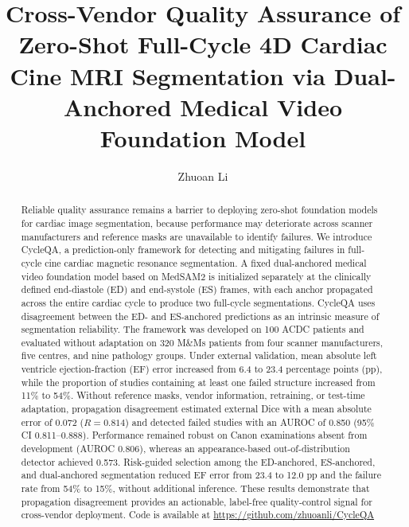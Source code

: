\documentclass[runningheads]{llncs}
\newcommand{\CQ}{CycleQA}
\begin{document}
\title{Cross-Vendor Quality Assurance of Zero-Shot Full-Cycle 4D Cardiac Cine MRI
Segmentation via Dual-Anchored Medical Video Foundation Model}

\author{Zhuoan Li}

\maketitle
\begin{abstract}
Reliable quality assurance remains a barrier to deploying zero-shot foundation models for cardiac image segmentation, because performance may deteriorate across scanner manufacturers and reference masks are unavailable to identify failures. We introduce \CQ{}, a prediction-only framework for detecting and mitigating failures in full-cycle cine cardiac magnetic resonance segmentation. A fixed dual-anchored medical video foundation model based on MedSAM2 is initialized separately at the clinically defined end-diastole (ED) and end-systole (ES) frames, with each anchor propagated across the entire cardiac cycle to produce two full-cycle segmentations. \CQ{} uses disagreement between the ED- and ES-anchored predictions as an intrinsic measure of segmentation reliability. The framework was developed on 100 ACDC patients and evaluated without adaptation on 320 M\&Ms patients from four scanner manufacturers, five centres, and nine pathology groups. Under external validation, mean absolute left ventricle ejection-fraction (EF) error increased from 6.4 to 23.4 percentage points (pp), while the proportion of studies containing at least one failed structure increased from 11\% to 54\%. Without reference masks, vendor information, retraining, or test-time adaptation, propagation disagreement estimated external Dice with a mean absolute error of 0.072 ($R=0.814$) and detected failed studies with an AUROC of 0.850 (95\% CI 0.811--0.888). Performance remained robust on Canon examinations absent from development (AUROC 0.806), whereas an appearance-based out-of-distribution detector achieved 0.573. Risk-guided selection among the ED-anchored, ES-anchored, and dual-anchored segmentation reduced EF error from 23.4 to 12.0 pp and the failure rate from 54\% to 15\%, without additional inference. These results demonstrate that propagation disagreement provides an actionable, label-free quality-control signal for cross-vendor deployment. Code is available at  \url{https://github.com/zhuoanli/CycleQA}

\end{abstract}
\end{document}
